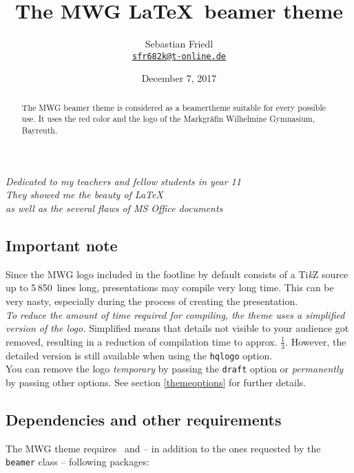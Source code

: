 \documentclass[11pt]{ltxdoc}
\title{The MWG \LaTeX\ beamer theme}
\author{Sebastian Friedl \\ \href{mailto:sfr682k@t-online.de}{\texttt{sfr682k@t-online.de}}}
\date{December 7, 2017}
\begin{document}
	\maketitle
	\thispagestyle{empty}
	

	\begin{center} \itshape
		Dedicated to my teachers and fellow students in year 11 \\[1.25\smallskipamount]
		They showed me the beauty of \LaTeX \\
		as well as the several flaws of MS Office documents
	\end{center}
	
	\medskip
	\begin{abstract}
		\hspace{-1.5em}%
		The MWG beamer theme is considered as a beamertheme suitable for every possible use. It uses the red color and the logo of the Markgräfin Wilhelmine Gymnasium, Bayreuth.
	\end{abstract}
	

	\tableofcontents

	\clearpage
	
	\subsection*{Important note}
	Since the MWG logo included in the footline by default consists of a Ti\textit{k}Z source up to 5\,850~lines long, presentations may compile very long time. This can be very nasty, especially during the process of creating the presentation. \\
	\emph{To reduce the amount of time required for compiling, the theme uses a simplified version of the logo.} Simplified means that details not visible to your audience got removed, resulting in a reduction of compilation time to approx. $\tfrac13$. However, the detailed version is still available when using the \texttt{hqlogo} option. \\
	You can remove the logo \emph{temporary} by passing the \texttt{draft} option or \emph{permanently} by passing other options. See section \ref{themeoptions} for further details.
	
	
	\subsection*{Dependencies and other requirements}
	The MWG theme requires \LaTeXe\ and -- in addition to the ones requested by the \texttt{beamer} class -- following packages:
	
\end{document}
